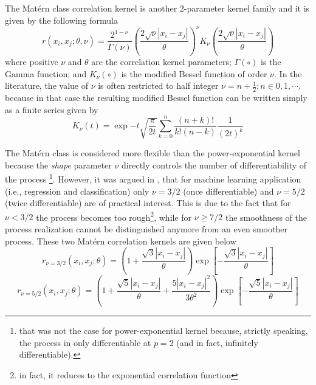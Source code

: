 The Mat\'ern class correlation kernel is another $2$-parameter kernel family and it is given by the following formula \cite{Santner2003,Rasmussen2006}
\begin{equation}
	r(x_i, x_j; \theta, \nu) = \frac{2^{1-\nu}}{\Gamma(\nu)} \left(\frac{2\sqrt{\nu} |x_i - x_j|}{\theta}\right)^\nu K_{\nu}\left(\frac{2\sqrt{\nu} |x_i - x_j|}{\theta}\right)
\label{eq:matern_kernel}
\end{equation}
where positive $\nu$ and $\theta$ are the correlation kernel parameters;
$\Gamma(\circ)$ is the Gamma function;
and $K_\nu (\circ)$ is the modified Bessel function of order $\nu$.
In the literature, the value of $\nu$ is often restricted to half integer $\nu = n + \frac{1}{2}; n \in {0,1,\cdots}$,
because in that case the resulting modified Bessel function can be written simply as a finite series given by
\begin{equation}
	K_\nu(t) = \exp{-t} \sqrt{\frac{\pi}{2t}} \sum_{k = 0}^{n} \frac{(n+k)!}{k! (n-k)} \frac{1}{(2t)^k}
\label{eq:modified_bessel}
\end{equation}

The Mat\'ern class is considered more flexible than the power-expo\-nential kernel because the \emph{shape} parameter $\nu$ directly controls the number of differentiability of the process \cite{Stein1989}\footnote{that was not the case for power-exponential kernel because, strictly speaking, the process in only differentiable at $p = 2$ (and in fact, infinitely differentiable).}.
However, it was argued in \cite{Rasmussen2006}, that for machine learning application (i.e., regression and classification) only $\nu = 3/2$ (once differentiable) and $\nu = 5/2$ (twice differentiable) are of practical interest.
This is due to the fact that for $\nu < 3/2$ the process becomes too rough\footnote{in fact, it reduces to the exponential correlation function},
while for $\nu \geq 7/2$ the smoothness of the process realization cannot be distinguished anymore from an even smoother process.
These two Mat\'ern correlation kernels are given below \cite{Roustant2012,Rasmussen2006}
\begin{equation}
	r_{\nu=3/2}(x_i, x_j;\theta) = \left(1 + \frac{\sqrt{3}|x_i - x_j|}{\theta}\right) \exp{\left[-\frac{\sqrt{3} |x_i - x_j|}{\theta}\right]}
\label{eq:matern3_2}
\end{equation}
\begin{equation}
	r_{\nu=5/2}(x_i, x_j;\theta) = \left(1 + \frac{\sqrt{5}|x_i - x_j|}{\theta} + \frac{5|x_i - x_j|^2}{3\theta^2}\right) \exp{\left[-\frac{\sqrt{5} |x_i - x_j|}{\theta}\right]}
\label{eq:matern5_2}
\end{equation}


